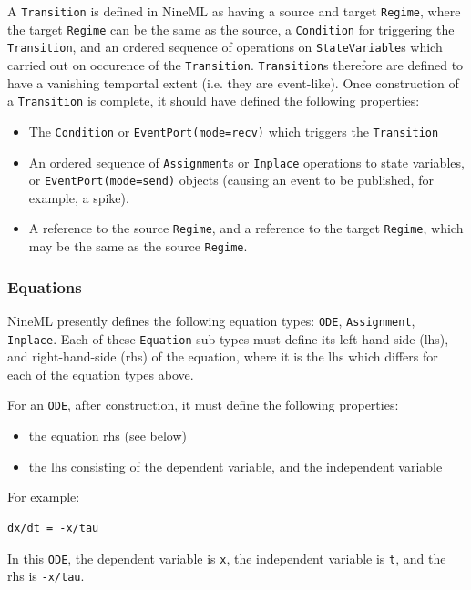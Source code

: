 \documentclass[a4paper]{article}
\newcommand\nmlClass[1]{{\tt #1}}
\begin{document}
A \nmlClass{Transition} is defined in NineML as having a source and target
\nmlClass{Regime}, where the target \nmlClass{Regime} can be the same as the source, a
\nmlClass{Condition} for triggering the \nmlClass{Transition}, and an ordered sequence of
operations on \nmlClass{StateVariable}s which carried out on occurence of the
\nmlClass{Transition}.  \nmlClass{Transition}s therefore are defined to have a vanishing
temportal extent (i.e. they are event-like).  Once construction of a
\nmlClass{Transition} is complete, it should have defined the following properties:
\begin{itemize}
\item The \nmlClass{Condition} or \nmlClass{EventPort(mode=recv)} which triggers the \nmlClass{Transition}
\item An ordered sequence of \nmlClass{Assignment}s or
  \nmlClass{Inplace} operations to state variables, or
  \nmlClass{EventPort(mode=send)} objects (causing an event to be published, for example, a spike).
\item A reference to the source \nmlClass{Regime}, and a reference to the target
  \nmlClass{Regime}, which may be the same as the source \nmlClass{Regime}.
\end{itemize}

\subsubsection{Equations}

NineML presently defines the following equation types: \nmlClass{ODE},
\nmlClass{Assignment}, \nmlClass{Inplace}.  Each of these \nmlClass{Equation} sub-types must define its
left-hand-side (lhs), and right-hand-side (rhs) of the equation, where
it is the lhs which differs for each of the equation types above.

For an \nmlClass{ODE}, after construction, it must define the following properties:
\begin{itemize}
\item the equation rhs (see below)
\item the lhs consisting of the dependent variable, and the independent variable
\end{itemize} 
For example:
\begin{lstlisting}[style=display]
dx/dt = -x/tau
\end{lstlisting}
In this \nmlClass{ODE}, the dependent variable is \verb^x^, the independent
variable is \verb^t^, and the rhs is \verb^-x/tau^.
\end{document}
